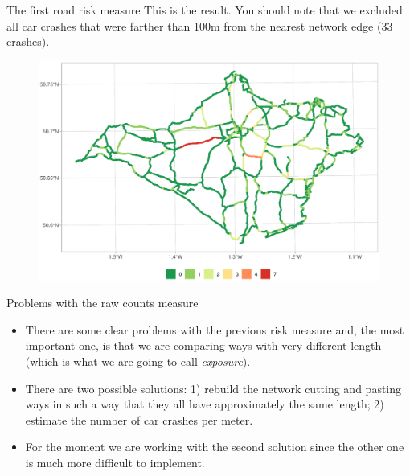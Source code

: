 \documentclass[c,10pt,pdftex]{beamer}
\begin{document}
\begin{frame}{The first road risk measure}
\vspace{-0.25cm}
This is the result. You should note that we excluded all car crashes that were farther than 100m from the nearest network edge (33  crashes). 
\begin{figure}
	\centering
	\includegraphics[width=\linewidth]{images/count_on_nearest_street}
\end{figure}
\end{frame}

\begin{frame}{Problems with the raw counts measure}
\begin{itemize}
	\setlength\itemsep{1em}
	\item There are some clear problems with the previous risk measure and, the most important one, is that we are comparing ways with very different length (which is what we are going to call \textit{exposure}). 
	\item There are two possible solutions: 1) rebuild the network cutting and pasting ways in such a way that they all have approximately the same length; 2) estimate the number of car crashes per meter. 
	\item For the moment we are working with the second solution since the other one is much more difficult to implement. 
\end{itemize}
\end{frame}
\end{document}
